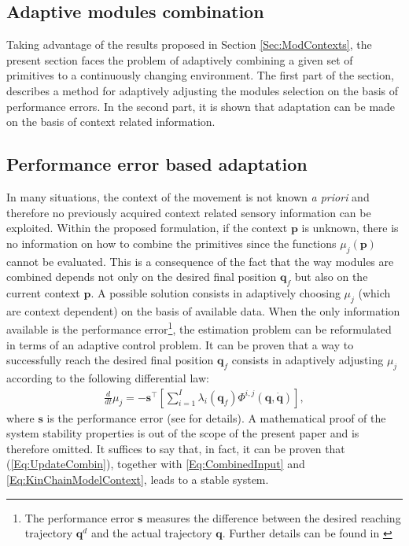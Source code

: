 \documentclass{svmult}
\newcommand{\q}{\mathbf q}
\begin{document}
\subsection{Adaptive modules combination}

Taking advantage of  the results proposed in Section \ref{Sec:ModContexts},
the present section faces the problem of adaptively combining a given set 
of primitives to a continuously changing environment. The first part of 
the section, describes a method for adaptively adjusting the modules selection
on the basis of performance errors. In the second part, it is shown that 
adaptation can be made on the basis of context related information.

\subsection{Performance error based adaptation}
\label{Sec:ErrorBasedAdapt}

In many situations, the context of the movement is not known {\em a
priori} and therefore no previously acquired context related sensory 
information can be exploited. Within the proposed formulation, if the context
$\mathbf p$ is unknown, there is no information on how to combine the  
primitives since the functions $\mu_j(\mathbf p)$ cannot be evaluated.
This is a consequence of the fact that the way modules are combined
depends not only on the desired final position $\mathbf q_f$ but
also on the current context $\mathbf p$. A possible solution
consists in adaptively choosing $\mu_j$ (which are context
dependent) on the basis of available data. When the only information
available is the performance error\footnote{The performance error
$\mathbf s$ measures the difference between the desired reaching
trajectory $\mathbf q^d$ and the actual trajectory $\q$. Further
details can be found in \cite{Kozlowski}}, the estimation problem can be 
reformulated in terms of an adaptive control problem. It can
be proven that a way to successfully reach the desired final
position $\mathbf q_f$ consists in adaptively adjusting $\mu_j$
according to the following differential law:
\begin{eqnarray} \label{Eq:UpdateCombin}
\frac{d}{dt}{\mu_j} = - \mathbf s^\top \left[ \sum_{i = 1}^I
\lambda_i(\mathbf q_f) \Phi^{i,j}(\mathbf q, \dot{\mathbf q})
\right],
\end{eqnarray}
where $\mathbf s$ is the performance error (see \cite{Kozlowski} for
details). A mathematical proof of the system stability properties is
out of the scope of the present paper and is therefore omitted. It
suffices to say that, in fact, it can be proven that
(\ref{Eq:UpdateCombin}), together with \eqref{Eq:CombinedInput}
and \eqref{Eq:KinChainModelContext}, leads to a stable system.
\end{document}
